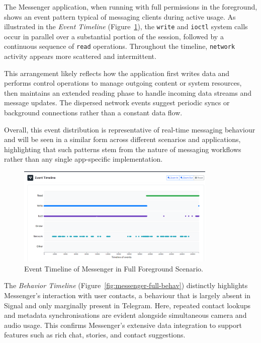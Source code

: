 \documentclass[a4paper,12pt]{report}
\begin{document}
The Messenger application, when running with full permissions in the foreground, shows an event pattern typical of messaging clients during active usage. As illustrated in the \textit{Event Timeline} (Figure~\ref{fig:messenger-full-events}), the \texttt{write} and \texttt{ioctl} system calls occur in parallel over a substantial portion of the session, followed by a continuous sequence of \texttt{read} operations. Throughout the timeline, \texttt{network} activity appears more scattered and intermittent.

This arrangement likely reflects how the application first writes data and performs control operations to manage outgoing content or system resources, then maintains an extended reading phase to handle incoming data streams and message updates. The dispersed network events suggest periodic syncs or background connections rather than a constant data flow.

Overall, this event distribution is representative of real-time messaging behaviour and will be seen in a similar form across different scenarios and applications, highlighting that such patterns stem from the nature of messaging workflows rather than any single app-specific implementation.

\begin{figure}[H]
    \centering
    \includegraphics[width=0.85\textwidth]{messenger-full-events.png}
    \caption{Event Timeline of Messenger in Full Foreground Scenario.}
    \label{fig:messenger-full-events}
\end{figure}

The \textit{Behavior Timeline} (Figure~\ref{fig:messenger-full-behav}) distinctly highlights Messenger’s interaction with user contacts, a behaviour that is largely absent in Signal and only marginally present in Telegram. Here, repeated contact lookups and metadata synchronisations are evident alongside simultaneous camera and audio usage. This confirms Messenger’s extensive data integration to support features such as rich chat, stories, and contact suggestions.
\end{document}
